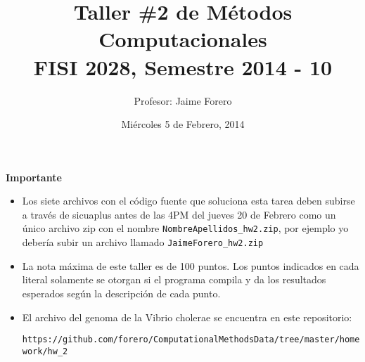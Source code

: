 \documentclass{article}
\title{Taller \#2 de M\'etodos Computacionales\\ FISI 2028, Semestre 2014 - 10}
\author{Profesor: Jaime Forero}
\date{Mi\'ercoles 5 de Febrero, 2014}
\begin{document}
\maketitle
\thispagestyle{empty}


{\bf Importante}
\begin{itemize}

\item Los siete archivos con el c\'odigo fuente que soluciona esta
  tarea deben subirse a trav\'es de sicuaplus antes de las 4PM del
  jueves 20 de Febrero como un \'unico archivo zip con el nombre
  \verb"NombreApellidos_hw2.zip", por ejemplo yo deber\'ia subir un
  archivo llamado \verb"JaimeForero_hw2.zip"

\item La nota m\'axima de este taller es de 100 puntos. Los puntos indicados
en cada literal solamente se otorgan si el programa compila y da los
resultados esperados seg\'un la descripci\'on de cada punto.
 

\item El archivo del genoma de la Vibrio cholerae se encuentra en este
  repositorio:

  \verb"https://github.com/forero/ComputationalMethodsData/tree/master/homework/hw_2"
\end{itemize}
\end{document}
